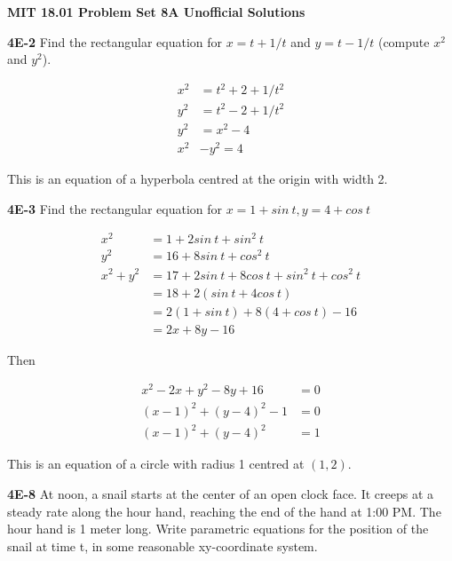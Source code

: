 \documentclass[9pt]{article}
\begin{document}
\begin{center}
  \large\textbf{MIT 18.01 Problem Set 8A Unofficial Solutions}
\end{center}

\begin{tcolorbox}
  \textbf{4E-2} Find the rectangular equation for $x = t + 1/t$ and $y = t - 1/t$ (compute $x^2$ and $y^2$).
\end{tcolorbox}

\begin{align*}
  x^2 &= t^2 + 2 + 1/t^2 \\
  y^2 &= t^2 - 2 + 1/t^2 \\
  y^2 &= x^2 -4 \\
  x^2 &- y^2 = 4
\end{align*}

This is an equation of a hyperbola centred at the origin with width 2.


\begin{tcolorbox}
  \textbf{4E-3} Find the rectangular equation for $x = 1 + sin\ t, y = 4 + cos\ t$
\end{tcolorbox}

\begin{align*}
  x^2 &= 1 + 2sin\ t + sin^2\ t \\
  y^2 &= 16 + 8sin\ t + cos^2\ t \\
  x^2 + y^2 &= 17 + 2sin\ t + 8cos\ t + sin^2\ t + cos^2\ t \\
  &= 18 + 2(sin\ t + 4cos\ t) \\
  &= 2(1 + sin\ t) + 8(4 + cos\ t) - 16 \\
  &= 2x + 8y - 16
\end{align*}

Then

\begin{align*}
  x^2 - 2x + y^2 - 8y + 16 &= 0 \\
  (x-1)^2 + (y-4)^2 - 1 &= 0 \\
  (x-1)^2 + (y-4)^2 &= 1
\end{align*}

This is an equation of a circle with radius 1 centred at $(1, 2)$.


\begin{tcolorbox}
  \textbf{4E-8} At noon, a snail starts at the center of an open clock face. It creeps at a steady rate along the hour hand, reaching the end of the hand at 1:00 PM. The hour hand is 1 meter long. Write parametric equations for the position of the snail at time t, in some reasonable xy-coordinate system.
\end{tcolorbox}
\end{document}
